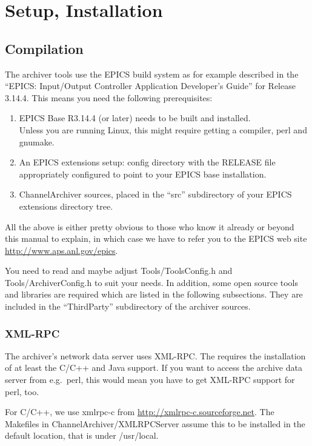 \chapter{Setup, Installation}

\section{Compilation}
The archiver tools use the EPICS build system as for example described
in the ``EPICS: Input/Output Controller Application Developer's
Guide'' for Release 3.14.4.  This means you need the following
prerequisites:
\begin{enumerate}
\item EPICS Base R3.14.4 (or later) needs to be built and installed.\\
      Unless you are running Linux, this might require getting a
      compiler, perl and gnumake.
\item An EPICS extensions setup: config directory with the RELEASE
      file appropriately configured to point to your EPICS base installation.
\item ChannelArchiver sources, placed in the ``src'' subdirectory of
      your EPICS extensions directory tree. 
\end{enumerate}

\noindent All the above is either pretty obvious to those who know it
already or beyond this manual to explain, in which case we have to
refer you to the EPICS web site
\href{http://www.aps.anl.gov/epics}{http://www.aps.anl.gov/epics}. 

You need to read and maybe adjust Tools/ToolsConfig.h and
Tools/ArchiverConfig.h to suit your needs.  In addition, some open
source tools and libraries are required which are listed in the
following subsections. They are included in the ``ThirdParty''
subdirectory of the archiver sources.

\subsection{XML-RPC}
The archiver's network data server uses XML-RPC. The  requires the installation of at least the C/C++ and Java
support. If you want to access the archive data server from e.g.\
perl, this would mean you have to get XML-RPC support for perl, too.

For C/C++, we use xmlrpc-c from
\href{http://xmlrpc-c.sourceforge.net}{http://xmlrpc-c.sourceforge.net}.
The Makefiles in ChannelArchiver/XMLRPCServer assume this to be
installed in the default location, that is under /usr/local.

